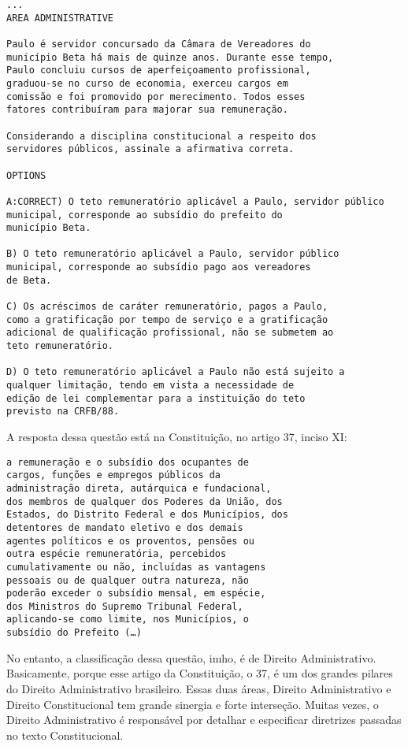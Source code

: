 \documentclass{article}
\begin{document}
\begin{verbatim}
...
AREA ADMINISTRATIVE

Paulo é servidor concursado da Câmara de Vereadores do 
município Beta há mais de quinze anos. Durante esse tempo, 
Paulo concluiu cursos de aperfeiçoamento profissional, 
graduou-se no curso de economia, exerceu cargos em 
comissão e foi promovido por merecimento. Todos esses 
fatores contribuíram para majorar sua remuneração. 
 
Considerando a disciplina constitucional a respeito dos 
servidores públicos, assinale a afirmativa correta. 
 
OPTIONS

A:CORRECT) O teto remuneratório aplicável a Paulo, servidor público 
municipal, corresponde ao subsídio do prefeito do 
município Beta. 

B) O teto remuneratório aplicável a Paulo, servidor público 
municipal, corresponde ao subsídio pago aos vereadores 
de Beta. 

C) Os acréscimos de caráter remuneratório, pagos a Paulo, 
como a gratificação por tempo de serviço e a gratificação 
adicional de qualificação profissional, não se submetem ao 
teto remuneratório. 

D) O teto remuneratório aplicável a Paulo não está sujeito a 
qualquer limitação, tendo em vista a necessidade de 
edição de lei complementar para a instituição do teto 
previsto na CRFB/88. 
\end{verbatim}

A resposta dessa questão está na Constituição, no artigo 37, inciso XI:

\begin{verbatim}
a remuneração e o subsídio dos ocupantes de
cargos, funções e empregos públicos da
administração direta, autárquica e fundacional,
dos membros de qualquer dos Poderes da União, dos
Estados, do Distrito Federal e dos Municípios, dos
detentores de mandato eletivo e dos demais
agentes políticos e os proventos, pensões ou
outra espécie remuneratória, percebidos
cumulativamente ou não, incluídas as vantagens 
pessoais ou de qualquer outra natureza, não 
poderão exceder o subsídio mensal, em espécie, 
dos Ministros do Supremo Tribunal Federal, 
aplicando-se como limite, nos Municípios, o 
subsídio do Prefeito (…)
\end{verbatim} 

No entanto, a classificação dessa questão, imho, é de Direito
Administrativo. Basicamente, porque esse artigo da Constituição, o 37,
é um dos grandes pilares do Direito Administrativo brasileiro. Essas
duas áreas, Direito Administrativo e Direito Constitucional tem grande
sinergia e forte interseção. Muitas vezes, o Direito Administrativo é
responsável por detalhar e especificar diretrizes passadas no texto
Constitucional.
\end{document}
